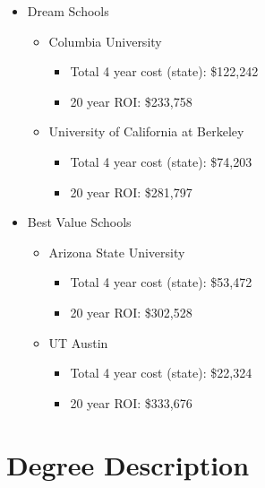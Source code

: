 \begin{itemize}
    \begin{itemize}
        \item{Dream Schools}
            \begin{itemize}
                \item{Columbia University}
                    \begin{itemize}
                        \item{Total 4 year cost (state):} \$122,242
                        \item{20 year ROI:} \$233,758
                    \end{itemize}
                \item{University of California at Berkeley}
                    \begin{itemize}
                        \item{Total 4 year cost (state):} \$74,203
                        \item{20 year ROI:} \$281,797
                    \end{itemize}
            \end{itemize}
        \item{Best Value Schools} 
            \begin{itemize}
                \item{Arizona State University}
                    \begin{itemize}
                        \item{Total 4 year cost (state):} \$53,472
                        \item{20 year ROI:} \$302,528
                    \end{itemize}
                \item{UT Austin}
                    \begin{itemize}
                        \item{Total 4 year cost (state):} \$22,324
                        \item{20 year ROI:} \$333,676
                    \end{itemize}
            \end{itemize}
    \end{itemize}
\end{itemize}

\section{Degree Description}
